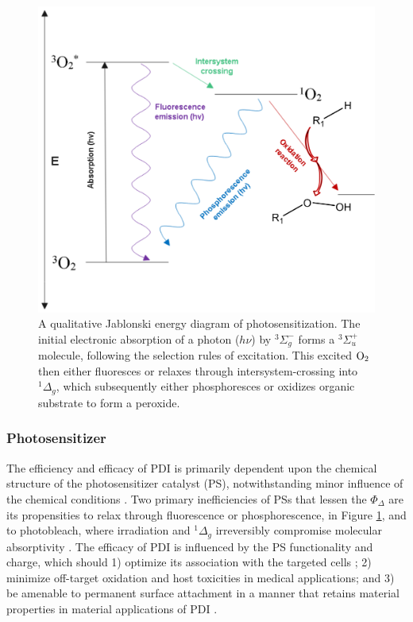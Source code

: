 \begin{figure}[t]
    \centering
    \includegraphics[width = \textwidth]{images/PDIpy/background/jablonski_diagram.png}
    \caption{
        A qualitative Jablonski energy diagram of photosensitization. The initial electronic absorption of a photon ($h\nu$) by $^3\Sigma_g^-$ forms a $^3\Sigma_u^+$ molecule, following the selection rules of excitation. This excited $\ce{O2}$ then either fluoresces or relaxes through intersystem-crossing into $^1\Delta_g$, which subsequently either phosphoresces or oxidizes organic substrate to form a peroxide.
    }
    \label{jablonski_diagram}
\end{figure}

\subsubsection{Photosensitizer}
The efficiency and efficacy of PDI is primarily dependent upon the chemical structure of the photosensitizer catalyst (PS), notwithstanding minor influence of the chemical conditions \cite{Kruk1998PhotophysicsLuminescence,Kullmann2012UltrafastBisporphyrin}. Two primary inefficiencies of PSs that lessen the $\Phi_{\Delta}$ are its propensities to relax through fluorescence or phosphorescence, in Figure \ref{jablonski_diagram}, and to photobleach, where irradiation and $^1\Delta_g$ irreversibly compromise molecular absorptivity \cite{Bonnett2010ChemInformTherapy,Wasser1973TheMetallochlorins}. The efficacy of PDI is influenced by the PS functionality and charge, which should 1) optimize its association with the targeted cells \cite{VanDerWal1997DeterminationBacteria,Dickson1989CellSurfaces}; 2) minimize off-target oxidation \cite{Lambrechts2005PhotodynamicMice} and host toxicities \cite{Quishida2016PhotodynamicLight} in medical applications; and 3) be amenable to permanent surface attachment in a manner that retains material properties \cite{McCoy2014PhotodynamicControl} in material applications of PDI \cite{Peddinti2018PhotodynamicThreat,Gottenbos2001AntimicrobialBacteria}. 

